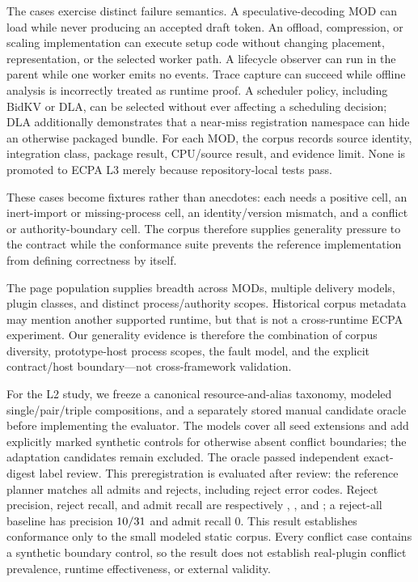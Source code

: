\documentclass[letterpaper,twocolumn,10pt]{article}
\begin{document}
The cases exercise distinct failure semantics.  A speculative-decoding MOD can
load while never producing an accepted draft token.  An offload, compression,
or scaling implementation can execute setup code without changing placement,
representation, or the selected worker path.  A lifecycle observer can run in
the parent while one worker emits no events.  Trace capture can succeed while
offline analysis is incorrectly treated as runtime proof.  A scheduler policy,
including BidKV or DLA, can be selected without ever affecting a scheduling
decision; DLA additionally demonstrates that a near-miss registration namespace
can hide an otherwise packaged bundle.  For each MOD, the corpus records source
identity, integration class, package result, CPU/source result, and evidence
limit.  None is promoted to ECPA L3 merely because repository-local tests pass.

These cases become fixtures rather than anecdotes: each needs a positive cell,
an inert-import or missing-process cell, an identity/version mismatch, and a
conflict or authority-boundary cell.  The corpus therefore supplies generality
pressure to the contract while the conformance suite prevents the reference
implementation from defining correctness by itself.

The page population supplies breadth across \ECPAWorkshopMods{} MODs, multiple
delivery models, plugin classes, and distinct process/authority scopes.
Historical corpus metadata may mention another supported runtime, but that is
not a cross-runtime ECPA experiment.  Our generality evidence is therefore the
combination of corpus diversity, prototype-host process scopes, the fault model, and
the explicit contract/host boundary---not cross-framework validation.

For the L2 study, we freeze a canonical resource-and-alias taxonomy,
\ECPAPlannerCases{} modeled
single/pair/triple compositions, and a separately stored manual candidate
oracle before implementing the evaluator.  The models cover all
\ECPAPlannerSeedExtensions{} seed extensions and add explicitly marked
synthetic controls for otherwise absent
conflict boundaries; the \ECPAAdaptationCandidates{} adaptation candidates
remain excluded.  The
oracle passed independent exact-digest label review.  This preregistration is
evaluated after review: the reference planner matches all \ECPAPlannerAdmits{}
admits and \ECPAPlannerRejects{}
rejects, including reject error codes.  Reject precision, reject recall, and
admit recall are respectively \ECPAPlannerRejectPrecision{},
\ECPAPlannerRejectRecall{}, and \ECPAPlannerAdmitRecall{}; a reject-all baseline
has precision $10/31$ and admit
recall 0.  This result establishes conformance only to the small modeled static
corpus.  Every conflict case contains a synthetic boundary control, so the
result does not establish real-plugin conflict prevalence, runtime
effectiveness, or external validity.
\end{document}
